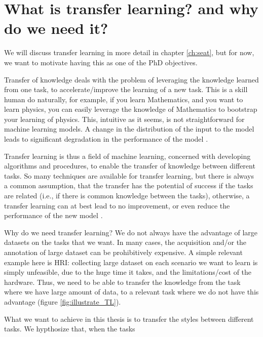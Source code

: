 \section{What is transfer learning? and why do we need it?}
\par We will discuss transfer learning in more detail in chapter \ref{ch:seat}, but for now, we want to motivate having this as one of the PhD objectives.

\par Transfer of knowledge deals with the problem of leveraging the knowledge learned from one task, to accelerate/improve the learning of a new task. This is a skill human do naturally, for example, if you learn Mathematics, and you want to learn physics, you can easily leverage the knowledge of Mathematics to bootstrap your learning of physics. This, intuitive as it seems, is not straightforward for machine learning models. A change in the distribution of the input to the model leads to significant degradation in the performance of the model \citep{shimodaira2000improving}.

\par Transfer learning is thus a field of machine learning, concerned with developing algorithms and procedures, to enable the transfer of knowledge between different tasks. So many techniques are available for transfer learning, but there is always a common assumption, that the transfer has the potential of success if the tasks are related (i.e., if there is common knowledge between the tasks), otherwise, a transfer learning can at best lead to no improvement, or even reduce the performance of the new model \citep{weiss2016survey}.

\par Why do we need transfer learning? We do not always have the advantage of large datasets on the tasks that we want. In many cases, the acquisition and/or the annotation of large dataset can be prohibitively expensive. A simple relevant example here is HRI: collecting large dataset on each scenario we want to learn is simply unfeasible, due to the huge time it takes, and the limitations/cost of the hardware. Thus, we need to be able to transfer the knowledge from the task where we have large amount of data, to a relevant task where we do not have this advantage (figure \ref{fig:illustrate_TL}).

\par What we want to achieve in this thesis is to transfer the styles between different tasks. We hypthosize that, when the tasks

